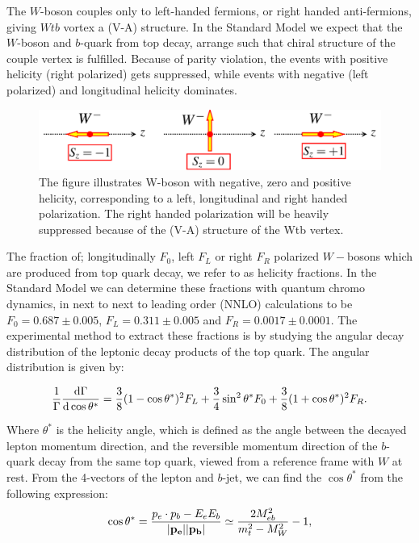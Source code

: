 \documentclass[12pt,a4paper]{article}
\numberwithin{equation}{section}
\begin{document}
The $W$-boson couples only to left-handed fermions, or right handed
anti-fermions, giving $Wtb$ vortex a (V-A) structure. In the Standard Model we
expect that the $W$-boson and $b$-quark from top decay, arrange such that chiral
structure of the couple vertex is fulfilled. Because of parity violation, the
events with positive helicity (right polarized) gets suppressed, while events
with negative (left polarized) and longitudinal helicity dominates.

\begin{figure}[H]
	\includegraphics[width=\linewidth]{figures/w_polarization.png}
	\caption{The figure illustrates W-boson with negative, zero and positive
    helicity, corresponding to a left, longitudinal and right handed
    polarization. The right handed polarization will be heavily suppressed
    because of the (V-A) structure of the Wtb vertex.}\label{fig:polarization}
\end{figure}

The fraction of; longitudinally $F_0$, left $F_L$ or right $F_R$ polarized
$W-$bosons which are produced from top quark decay, we refer to as helicity
fractions. In the Standard Model we can determine these fractions with quantum
chromo dynamics, in next to next to leading order (NNLO) calculations to be
$F_0 = 0.687 \pm 0.005$, $F_L = 0.311 \pm 0.005$ and
$F_R = 0.0017 \pm 0.0001$\cite{Czarnecki_2010}. The experimental method to
extract these fractions is by studying the angular decay distribution of the
leptonic decay products of the top quark. The angular distribution is given by:

\begin{equation}
  \frac{1}{\Gamma}\dv{\Gamma}{\cos \theta^*} = \frac{3}{8}(1-\cos \theta^*)^2 F_L +
  \frac{3}{4}\sin^2 \theta^* F_0 + \frac{3}{8}(1+\cos \theta^*)^2 F_R.
\end{equation}

Where $\theta^*$ is the helicity angle, which is defined as the angle between the
decayed lepton momentum direction, and the reversible momentum direction of the
$b$-quark decay from the same top quark, viewed from a reference frame with $W$
at rest\cite{PhysRevD.45.124}. From the 4-vectors of the lepton and $b$-jet, we
can find the $\cos \theta^*$ from the following expression:
\begin{equation}
  \cos \theta^*=\frac{p_e\cdot p_b-E_eE_b}{\abs{\vb{p_e}}\abs{\vb{p_b}}} \simeq \frac{2 M_{eb}^2}{m_t^2 - M_W^2} - 1, \label{eq:costheta}
\end{equation}
\end{document}
